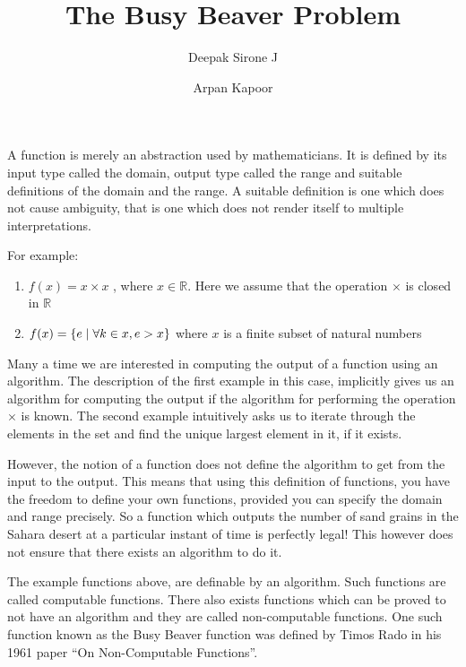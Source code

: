 \documentclass[a4paper]{article}
\begin{document}
\title{The Busy Beaver Problem}
\author{Deepak Sirone J \and Arpan Kapoor}
\maketitle

A function is merely an abstraction used by mathematicians. It is defined by
its input type called the domain, output type called the range and suitable
definitions of the domain and the range. A suitable definition is one which
does not cause ambiguity, that is one which does not render itself to multiple
interpretations.

For example:
\begin{enumerate}
  \item \(f(x) = x \times x\) , where \(x \in \mathbb{R}\).
    Here we assume that the operation \(\times\) is closed in \(\mathbb{R}\)

  \item \(f(x) = \{e \mid \forall k \in x,\space \space e > x\}\) where \(x\) is
    a finite subset of natural numbers
\end{enumerate}

Many a time we are interested in computing the output of a function using an
algorithm. The description of the first example in this case, implicitly gives
us an algorithm for computing the output if the algorithm for performing the
operation \(\times\) is known. The second example intuitively asks us to
iterate through the elements in the set and find the unique largest element
in it, if it exists.

However, the notion of a function does not define the algorithm to get from
the input to the output. This means that using this definition of functions,
you have the freedom to define your own functions, provided you can specify the
domain and range precisely. So a function which outputs the number of sand
grains in the Sahara desert at a particular instant of time is perfectly legal!
This however does not ensure that there exists an algorithm to do it.

The example functions above, are definable by an algorithm. Such functions are
called computable functions. There also exists functions which can be proved
to not have an algorithm and they are called non-computable functions. One such
function known as the Busy Beaver function was defined by Timos Rado in his
1961 paper ``On Non-Computable Functions''\cite{rado_non-computable_1962}.
\end{document}

